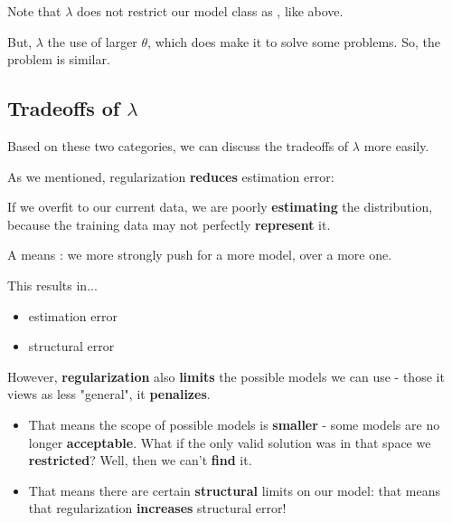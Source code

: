         
        \begin{clarification}
           Note that $\lambda$ does not restrict our model class  as , like above. 
        
            But, $\lambda$  the use of larger $\theta$, which does make it  to solve some problems. So, the  problem is similar.
        \end{clarification}
        
    \subsection{Tradeoffs of $\lambda$}
        
        Based on these two categories, we can discuss the tradeoffs of $\lambda$ more easily.
        
        As we mentioned, regularization \textbf{reduces} estimation error: 
        
        If we overfit to our current data, we are poorly \textbf{estimating} the distribution, because the training data may not perfectly \textbf{represent} it.\\
        
        \begin{concept}
            A  means : we more strongly push for a more  model, over a more  one.
            
            This results in...
            
            \begin{itemize}
                \item {} estimation error
                \item {} structural error
            \end{itemize}
        \end{concept}
        
        However, \textbf{regularization} also \textbf{limits} the possible models we can use - those it views as less "general", it \textbf{penalizes}.

        \begin{itemize}
            \item That means the scope of possible models is \textbf{smaller} - some models are no longer \textbf{acceptable}. What if the only valid solution was in that space we \textbf{restricted}? Well, then we can't \textbf{find} it.
            
            \item That means there are certain \textbf{structural} limits on our model: that means that regularization \textbf{increases} structural error!\\
        \end{itemize}
        
